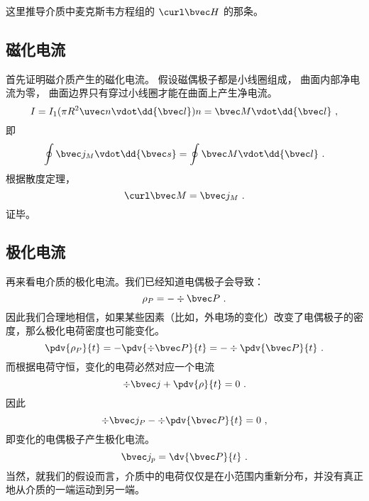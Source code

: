 


这里推导介质中麦克斯韦方程组的 $\curl \bvec H$ 的那条。

\subsection{磁化电流}
首先证明磁介质产生的磁化电流。 假设磁偶极子都是小线圈组成， 曲面内部净电流为零， 曲面边界只有穿过小线圈才能在曲面上产生净电流。
\begin{equation}
I = I_1 (\pi R^2 \uvec n \vdot \dd{\bvec l}) n = \bvec M \vdot \dd{\bvec l}~,
\end{equation}
即
\begin{equation}
\oint \bvec j_M \vdot \dd{\bvec s} = \oint \bvec M \vdot \dd{\bvec l}~.
\end{equation}
根据散度定理，
\begin{equation}
\curl \bvec M = \bvec j_M~.
\end{equation}
证毕。

\subsection{极化电流}
再来看电介质的极化电流。我们已经知道电偶极子会导致：
$$\rho_P=-\div \bvec P~.$$
因此我们合理地相信，如果某些因素（比如，外电场的变化）改变了电偶极子的密度，那么极化电荷密度也可能变化。
$$\pdv{\rho_P}{t}=-\pdv{\div \bvec P}{t}=-\div \pdv{\bvec P}{t}~.$$
而根据电荷守恒，变化的电荷必然对应一个电流
$$\div \bvec j + \pdv{\rho}{t}=0~.$$
因此
$$
\div \bvec j_P -\div \pdv{\bvec P}{t}=0~,
$$
即变化的电偶极子产生极化电流。
\begin{equation}
\bvec j_p = \dv{\bvec P}{t}~.
\end{equation}
当然，就我们的假设而言，介质中的电荷仅仅是在小范围内重新分布，并没有真正地从介质的一端运动到另一端。

